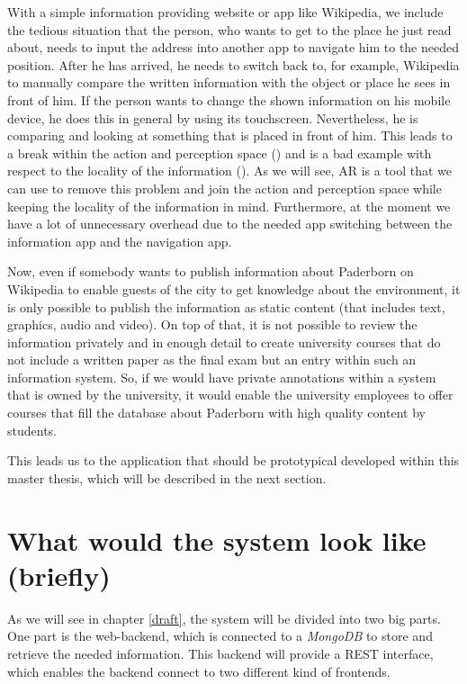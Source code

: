 With a simple information providing website or app like Wikipedia, we include the tedious situation that the person, who wants to get to the place he just read about, needs to input the address into another app to navigate him to the needed position. After he has arrived, he needs to switch back to, for example, Wikipedia to manually compare the written information with the object or place he sees in front of him. If the person wants to change the shown information on his mobile device, he does this in general by using its touchscreen. Nevertheless, he is comparing and looking at something that is placed in front of him. This leads to a break within the action and perception space (\cite{ham01}) and is a bad example with respect to the locality of the information (\cite{Bon10}). As we will see, \ac{AR} is a tool that we can use to remove this problem and join the action and perception space while keeping the locality of the information in mind.  Furthermore, at the moment we have a lot of unnecessary overhead due to the needed app switching between the information app and the navigation app.   

Now, even if somebody wants to publish information about Paderborn on Wikipedia to enable guests of the city to get knowledge about the environment, it is only possible to publish the information as static content (that includes text, graphics, audio and video). On top of that, it is not possible to review the information privately and in enough detail to create university courses that do not include a written paper as the final exam but an entry within such an information system.  So, if we would have private annotations within a system that is owned by the university, it would enable the university employees to offer courses that fill the database about Paderborn with high quality content by students.

This leads us to the application that should be prototypical developed within this master thesis, which will be described in the next section. 

\section{What would the system look like (briefly)}
As we will see in chapter \ref{draft}, the system will be divided into two big parts. One part is the web-backend, which is connected to a \textit{MongoDB} to store and retrieve the needed information. This backend will provide a \ac{REST} interface, which enables the backend connect to two different kind of frontends. 

